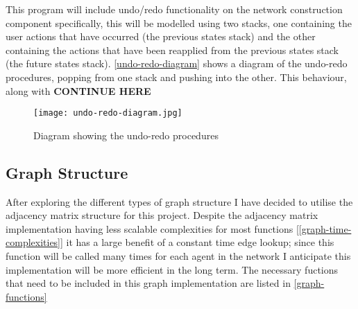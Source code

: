     This program will include undo/redo functionality on the network construction component specifically, this will be modelled using two stacks, one containing the user actions that have occurred (the previous states stack) and the other containing the actions that have been reapplied from the previous states stack (the future states stack). \autoref{undo-redo-diagram} shows a diagram of the undo-redo procedures, popping from one stack and pushing into the other. This behaviour, along with \textbf{CONTINUE HERE}

    \begin{figure}
        \centering
        \texttt{[image: undo-redo-diagram.jpg]}
        \caption{Diagram showing the undo-redo procedures}
        \label{undo-redo-diagram}
    \end{figure}

    \subsection{Graph Structure}

        After exploring the different types of graph structure I have decided to utilise the adjacency matrix structure for this project. Despite the adjacency matrix implementation having less scalable complexities for most functions [\autoref{graph-time-complexities}] it has a large benefit of a constant time edge lookup; since this function will be called many times for each agent in the network I anticipate this implementation will be more efficient in the long term. The necessary fuctions that need to be included in this graph implementation are listed in \autoref{graph-functions}

